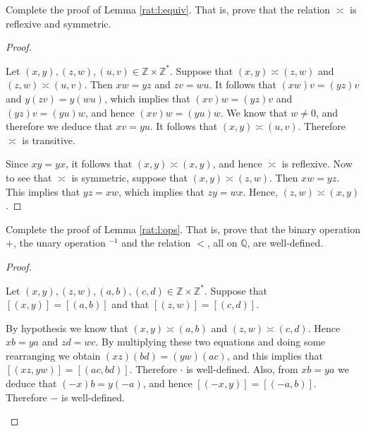 \Newpage
\begin{exercise} %
	Complete the proof of Lemma \ref{rat:l:equiv}. That is, prove that the relation $\asymp$ is reflexive and symmetric.
\end{exercise}

\begin{proof}
	\begin{notmine}
		Let $(x, y), (z, w), (u, v) \in \mathbb{Z} \times \mathbb{Z}^{*}$. Suppose that $(x, y) \asymp (z, w)$ and $(z, w) \asymp (u, v)$. Then $x w = y z$ and $z v = w u$. It follows that $(x w)v = (y z) v$ and $y(z v) = y(w u)$, which implies that $(x v) w = (y z) v$ and $(y z) v = (y u) w$, and hence $(x v) w = (y u) w$. We know that $w \neq 0$, and therefore we deduce that $x v = y u$. It follows that $(x, y) \asymp (u, v)$. Therefore $\asymp$ is transitive.
	\end{notmine}
	Since $x y = y x$, it follows that $(x, y) \asymp (x, y)$, and hence $\asymp$ is reflexive. Now to see that $\asymp$ is symmetric, suppose that $(x, y) \asymp (z, w)$. Then $x w = y z$. This implies that $y z = x w$, which implies that $z y = w x$. Hence, $(z, w) \asymp (x, y)$.
\end{proof}

\Newpage
\begin{exercise} %
	Complete the proof of Lemma \ref{rat:l:ops}. That is, prove that the binary operation $+$, the unary operation $^{-1}$ and the relation $<$, all on $\mathbb{Q}$, are well-defined.
\end{exercise}

\begin{proof}
	\begin{notmine}
		Let $(x, y), (z, w), (a, b), (c, d) \in \mathbb{Z} \times \mathbb{Z}^{*}$. Suppose that $[(x, y)] = [(a, b)]$ and that $[(z, w)] = [(c, d)]$.

		By hypothesis we know that $(x, y) \asymp (a, b)$ and $(z, w) \asymp (c, d)$. Hence $x b = y a$ and $z d = w c$. By multiplying these two equations and doing some rearranging we obtain $(x z)(b d) = (y w)(a c)$, and this implies that $[(x z, y w)] = [(a c, b d)]$. Therefore $\cdot$ is well-defined. Also, from $x b = y a$ we deduce that $(-x)b = y(-a)$, and hence $[(-x, y)] = [(-a, b)]$. Therefore $-$ is well-defined.
	\end{notmine}

	\TODO
\end{proof}

